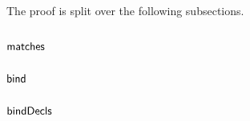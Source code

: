 
The proof is split over the following subsections.


\subsection{$\mathop{\sf matches}$}

\subsection{$\mathop{\sf bind}\nolimits$}

\subsection{$\mathop{\sf bindDecls}$}

